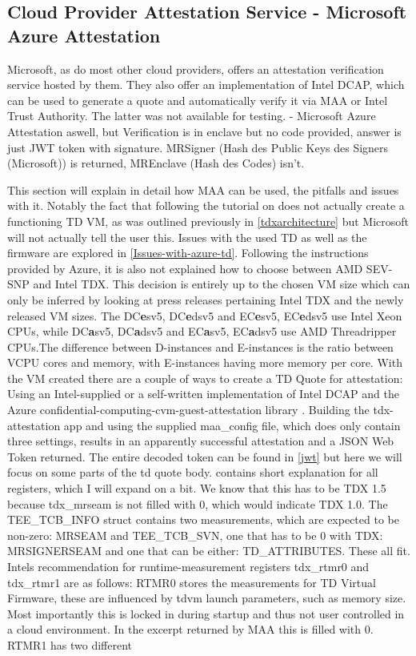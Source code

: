 \subsection{Cloud Provider Attestation Service - Microsoft Azure Attestation}
 Microsoft, as do most other cloud providers, offers an attestation verification service hosted by them. They also offer an implementation of Intel DCAP, which can be used to generate a quote and automatically verify it via MAA or Intel Trust Authority. The latter was not available for testing.
- Microsoft Azure Attestation aswell, but Verification is in enclave but no code provided, answer is just JWT token with signature. MRSigner (Hash des Public Keys des Signers (Microsoft)) is returned, MREnclave (Hash des Codes) isn't.

This section will explain in detail how MAA can be used, the pitfalls and issues with it. Notably the fact that following the tutorial on \cite{chasecrum_github_create_2024} does not actually create a functioning TD VM, as was outlined previously in \ref{tdxarchitecture} but Microsoft will not actually tell the user this. Issues with the used TD as well as the firmware are explored in \ref{Issues-with-azure-td}. Following the instructions provided by Azure, it is also not explained how to choose between AMD SEV-SNP and Intel TDX. This decision is entirely up to the chosen VM size which can only be inferred by looking at press releases pertaining Intel TDX and the newly released VM sizes. The DC\textbf{e}sv5, DC\textbf{e}dsv5 and EC\textbf{e}sv5, EC\textbf{e}dsv5 use Intel Xeon CPUs, while DC\textbf{a}sv5, DC\textbf{a}dsv5 and EC\textbf{a}sv5, EC\textbf{a}dsv5 use AMD Threadripper CPUs.The difference between D-instances and E-instances is the ratio between VCPU cores and memory, with E-instances having more memory per core. With the VM created there are a couple of ways to create a TD Quote for attestation: Using an Intel-supplied or a self-written implementation of Intel DCAP and the Azure confidential-computing-cvm-guest-attestation library \cite{microsoft_corporation_azureconfidential-computing-cvm-guest-attestation_nodate}. Building the tdx-attestation app and using the supplied maa\_config file, which does only contain three settings, results in an apparently successful attestation and a JSON Web Token returned. The entire decoded token can be found in \ref{jwt} but here we will focus on some parts of the td quote body. \cite{intel_corporation_dcap_2024-1} contains short explanation for all registers, which I will expand on a bit. We know that this has to be TDX 1.5 because tdx\_mrseam is not filled with 0, which would indicate TDX 1.0. The TEE\_TCB\_INFO struct contains two measurements, which are expected to be non-zero: MRSEAM and TEE\_TCB\_SVN, one that has to be 0 with TDX: MRSIGNERSEAM and one that can be either: TD\_ATTRIBUTES. These all fit. Intels recommendation for runtime-measurement registers tdx\_rtmr0 and tdx\_rtmr1 are as follows: RTMR0 stores the measurements for TD Virtual Firmware, these are influenced by tdvm launch parameters, such as memory size. Most importantly this is locked in during startup and thus not user controlled in a cloud environment. In the excerpt returned by MAA this is filled with 0. RTMR1 has two different 